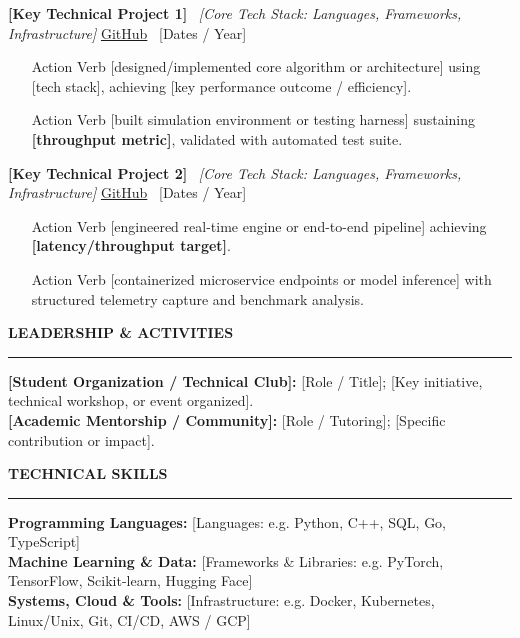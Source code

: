 \documentclass[10pt,letterpaper]{article}
\newcommand{\cvsection}[1]{%
  \vspace{3.5pt}%
  {\small\textbf{\MakeUppercase{#1}}}\\[-3.5pt]%
  \rule{\textwidth}{0.4pt}\par\vspace{2pt}%
}
\begin{document}
\textbf{[Key Technical Project 1]} \textbar\ \textit{[Core Tech Stack: Languages, Frameworks, Infrastructure]} \hfill \href{https://github.com/username/project-repo}{\small GitHub} \textbullet\ [Dates / Year]
\begin{itemize}
    \item [Action Verb] [designed/implemented core algorithm or architecture] using [tech stack], achieving [key performance outcome / efficiency].
    \item [Action Verb] [built simulation environment or testing harness] sustaining \textbf{[throughput metric]}, validated with automated test suite.
\end{itemize}

\vspace{2pt}
\textbf{[Key Technical Project 2]} \textbar\ \textit{[Core Tech Stack: Languages, Frameworks, Infrastructure]} \hfill \href{https://github.com/username/project-repo}{\small GitHub} \textbullet\ [Dates / Year]
\begin{itemize}
    \item [Action Verb] [engineered real-time engine or end-to-end pipeline] achieving \textbf{[latency/throughput target]}.
    \item [Action Verb] [containerized microservice endpoints or model inference] with structured telemetry capture and benchmark analysis.
\end{itemize}

\cvsection{Leadership \& Activities}
\textbf{[Student Organization / Technical Club]:} [Role / Title]; [Key initiative, technical workshop, or event organized].\\
\textbf{[Academic Mentorship / Community]:} [Role / Tutoring]; [Specific contribution or impact].

\cvsection{Technical Skills}
\textbf{Programming Languages:} [Languages: e.g. Python, C++, SQL, Go, TypeScript]\\
\textbf{Machine Learning \& Data:} [Frameworks \& Libraries: e.g. PyTorch, TensorFlow, Scikit-learn, Hugging Face]\\
\textbf{Systems, Cloud \& Tools:} [Infrastructure: e.g. Docker, Kubernetes, Linux/Unix, Git, CI/CD, AWS / GCP]
\end{document}
